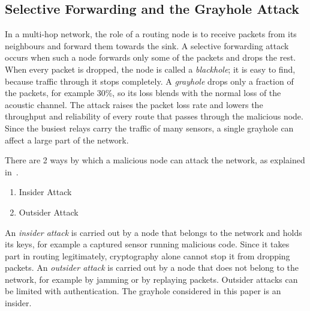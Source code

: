 \documentclass[conference]{IEEEtran}
\begin{document}
\subsection{Selective Forwarding and the Grayhole Attack}
In a multi-hop network, the role of a routing node is to receive packets from its neighbours and forward them towards the sink. A selective forwarding attack~\cite{karlof} occurs when such a node forwards only some of the packets and drops the rest. When every packet is dropped, the node is called a \emph{blackhole}; it is easy to find, because traffic through it stops completely. A \emph{grayhole} drops only a fraction of the packets, for example 30\%, so its loss blends with the normal loss of the acoustic channel. The attack raises the packet loss rate and lowers the throughput and reliability of every route that passes through the malicious node. Since the busiest relays carry the traffic of many sensors, a single grayhole can affect a large part of the network.

There are 2 ways by which a malicious node can attack the network, as explained in~\cite{karlof,domingo}.
\begin{enumerate}
\item Insider Attack
\item Outsider Attack
\end{enumerate}
An \emph{insider attack} is carried out by a node that belongs to the network and holds its keys, for example a captured sensor running malicious code. Since it takes part in routing legitimately, cryptography alone cannot stop it from dropping packets. An \emph{outsider attack} is carried out by a node that does not belong to the network, for example by jamming or by replaying packets. Outsider attacks can be limited with authentication. The grayhole considered in this paper is an insider.
\end{document}
